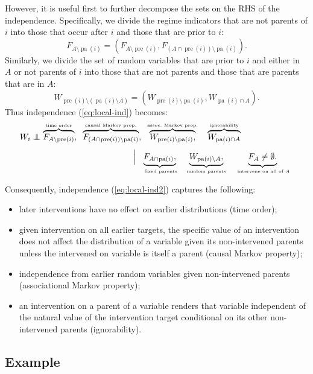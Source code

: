 \documentclass[11pt]{article}
\DeclareMathOperator{\pa}{pa}
\DeclareMathOperator{\pre}{pre}
\newcommand\indep{\protect\mathpalette{\protect\independenT}{\perp}}
\def\independenT#1#2{\mathrel{\rlap{$#1#2$}\mkern2.5mu{#1#2}}}
\begin{document}
{However, it is useful first to further decompose the sets on the RHS of the independence. Specifically, we divide the regime indicators that are not parents of $i$ into those that occur after $i$ and those that are prior to $i$:
\[
F_{A\setminus \pa(i)} = \left( F_{A\setminus \pre(i)}, F_{(A\cap \pre(i))\setminus \pa(i)}\right).
\]
Similarly, we divide the set of random variables that are prior to $i$ and either in $A$ or not parents of $i$ into 
those that are not parents and those that are parents that are in $A$: 
\[
W_{\pre(i)\setminus (\pa (i)\setminus A)} =  \left( W_{\pre(i)\setminus \pa(i)}, W_{\pa (i)\cap A}\right).
\]
Thus independence (\ref{eq:local-ind}) becomes:
\begin{align}
W_i &\indep \overbrace{F_{A\setminus \pre(i)}}^{\hbox{\tiny time order}},\;\;   
\overbrace{F_{(A\cap \pre(i))\setminus \pa(i)}}^{\hbox{\tiny causal Markov prop.}},\;\;\overbrace{W_{\pre(i)\setminus \pa(i)},}^{\hbox{\tiny assoc.~Markov prop.}} \quad \overbrace{W_{\pa(i) \cap A}}^{\hbox{\tiny ignorability}}\label{eq:local-ind2} \\[4pt]
&\kern120pt  
\left| \vphantom{\bigcup}\right.
\underbrace{F_{A \cap \pa(i)},}_{\hbox{\tiny~~ fixed parents~~}}
\underbrace{W_{\pa(i) \setminus A},}_{\hbox{\tiny ~~random parents~~}}
\underbrace{F_{A\vphantom{\mid}} \neq \emptyset.}_{\hbox{\tiny ~~ intervene on all of $A$~~}}\nonumber
\end{align}

Consequently, independence (\ref{eq:local-ind2}) captures the following:
\begin{itemize}
\item later interventions have no effect on earlier distributions (time order);
\item given intervention on all earlier targets, the specific value of an intervention does not affect the distribution of a variable given its non-intervened parents unless the intervened on variable is itself a parent (causal Markov property);
\item independence from earlier random variables given non-intervened parents (associational Markov property);
\item an intervention on a parent of a variable renders that variable independent of the natural value of the intervention target conditional on its other non-intervened parents (ignorability).
\end{itemize}

\subsection{Example}

}
\end{document}
